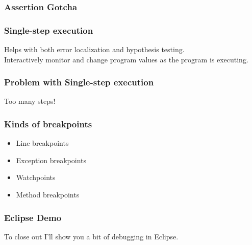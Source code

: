 \begin{frame}
\frametitle{Assertion Gotcha}

\Large
\begin{center}
\end{center}

\end{frame}

\begin{frame}
\frametitle{Single-step execution}

\begin{changemargin}{1cm}
\Large
Helps with both error localization and hypothesis testing.\\[1em]

Interactively monitor and change program values as the
program is executing.
\end{changemargin}

\end{frame}

\begin{frame}
\frametitle{Problem with Single-step execution}

\begin{changemargin}{1cm}
\Large
Too many steps!\\[1em]


\end{changemargin}

\end{frame}

\begin{frame}
\frametitle{Kinds of breakpoints}

\begin{changemargin}{1cm}

\Large
\begin{itemize}
\item Line breakpoints
\item Exception breakpoints
\item Watchpoints
\item Method breakpoints
\end{itemize}

\end{changemargin}

\end{frame}


\begin{frame}
\frametitle{Eclipse Demo}

\begin{changemargin}{1cm}

To close out I'll show you a bit of debugging in Eclipse.
\end{changemargin}

\end{frame}



